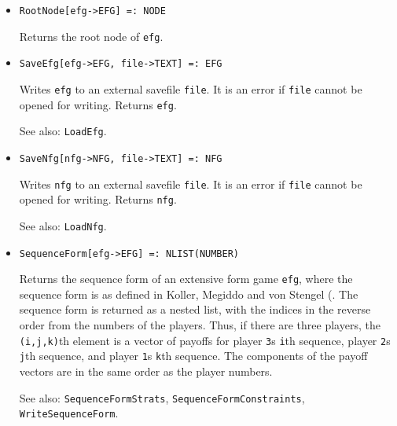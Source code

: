 \begin{itemize}
\item{}
\protect \large \begin{verbatim}
RootNode[efg->EFG] =: NODE 
\end{verbatim}\normalsize

\bd
Returns the root node of \verb+efg+.
\ed


\item{}
\protect \large \begin{verbatim}
SaveEfg[efg->EFG, file->TEXT] =: EFG 
\end{verbatim}\normalsize

\bd
Writes \verb+efg+ to an external savefile \verb+file+.  It is an error
if \verb+file+ cannot be opened for writing.  Returns \verb+efg+.
\item [See also:] \verb+LoadEfg+.
\ed

\item{}
\protect \large \begin{verbatim}
SaveNfg[nfg->NFG, file->TEXT] =: NFG 
\end{verbatim}\normalsize

\bd
Writes \verb+nfg+ to an external savefile \verb+file+.  It is an
error if \verb+file+ cannot be opened for writing.  Returns \verb+nfg+.
\item [See also:] \verb+LoadNfg+.
\ed


\item{}
\protect \large \begin{verbatim} 
SequenceForm[efg->EFG] =: NLIST(NUMBER)
\end{verbatim}\normalsize

\bd
Returns the sequence form of an extensive form game \verb+efg+, where
the sequence form is as defined in Koller, Megiddo and von Stengel
(\cite{KolMegSte:94}.  The sequence form is returned as a nested list,
with the indices in the reverse order from the numbers of the players.
Thus, if there are three players, the \verb+(i,j,k)+th element is a
vector of payoffs for player \verb+3+s \verb+i+th sequence, player
\verb+2+s \verb+j+th sequence, and player \verb+1+s \verb+k+th
sequence.  The components of the payoff vectors are in the same order
as the player numbers.
\item [See also:] \verb+SequenceFormStrats+,
\verb+SequenceFormConstraints+, \verb+WriteSequenceForm+.  
\ed


\end{itemize}

